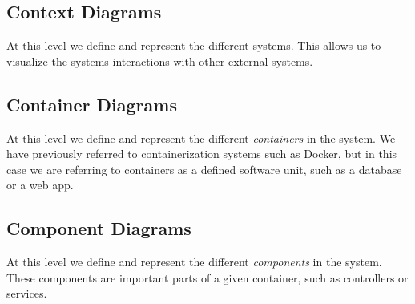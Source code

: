 
\subsection{Context Diagrams}

At this level we define and represent the different systems. This allows us to visualize the systems interactions with other external systems.


\subsection{Container Diagrams}

At this level we define and represent the different \textit{containers} in the system. We have previously referred to containerization systems such as Docker, but in this case we are referring to containers as a defined software unit, such as a database or a web app.


\subsection{Component Diagrams}

At this level we define and represent the different \textit{components} in the system. These components are important parts of a given container, such as controllers or services.

